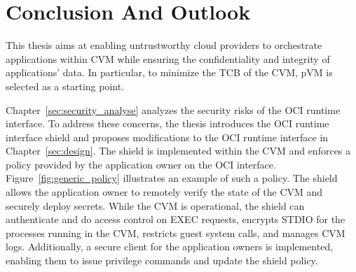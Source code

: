 \chapter{Conclusion And Outlook}
\label{sec:conclusion}





This thesis aims at enabling untrustworthy cloud providers to orchestrate applications within \acrshort{CVM} while ensuring the confidentiality and integrity of applications' data. In particular, to minimize the \acrshort{TCB} of the CVM, \acrshort{pVM} is selected as a starting point.
 
Chapter~\ref{sec:security_analyse} analyzes the security risks of the OCI runtime interface. To address these concerns, the thesis introduces the OCI runtime interface shield and proposes modifications to the OCI runtime interface in Chapter~\ref{sec:design}. The shield is implemented 
within the \acrshort{CVM} and enforces a policy provided by the application owner on the OCI interface. Figure~\ref{fig:generic_policy} illustrates an example of such a policy. The shield allows the application owner to remotely verify the state of the \acrshort{CVM} and securely deploy secrets. 
While the \acrshort{CVM} is operational, the shield can authenticate and do access control on EXEC requests, encrypts STDIO for the processes running in the \acrshort{CVM}, restricts guest system calls, and manages \acrshort{CVM} logs. Additionally, a secure client for the application owners is 
implemented, enabling them to issue privilege commands and update the shield policy.
 
